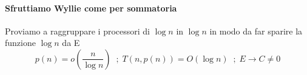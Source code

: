 \paragraph{Sfruttiamo Wyllie come per sommatoria}
Proviamo a raggruppare i processori di $\log n $ in $\log n$ in modo da far sparire la funzione $\log n$ da E
$$p(n) = o(\frac{n}{\log n})\;\;;\; T(n,p(n)) = O(\log n)\;\; ; \; E \rightarrow C \neq 0$$

